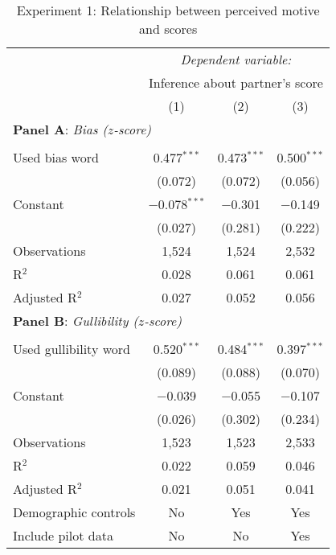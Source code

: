 \begin{table}[!htbp] \centering 
  \caption{Experiment 1: Relationship between perceived motive and scores}
  \label{t:1-validation}
\begin{threeparttable}
\begin{tabular}{@{\hspace{5pt}}l@{\hspace{5pt}}ccc} 
\toprule 
 & \multicolumn{3}{c}{\textit{Dependent variable:}} \\ 
\cmidrule(rr){2-4} 
 & \multicolumn{3}{c}{Inference about partner's score} \\ 
 \cmidrule(lr){2-4}
 & (1) & (2) & (3)\\ 
\midrule
\multicolumn{4}{l}{\textbf{Panel A}: \textit{Bias ($z$-score)}} \\
\midrule
\\[-2.1ex] Used bias word & 0.477$^{***}$ & 0.473$^{***}$ & 0.500$^{***}$ \\ 
  & (0.072) & (0.072) & (0.056) \\ 
 \addlinespace 
 Constant & $-$0.078$^{***}$ & $-$0.301 & $-$0.149 \\ 
  & (0.027) & (0.281) & (0.222) \\ 
 \addlinespace 
\midrule  
Observations & 1,524 & 1,524 & 2,532 \\ 
R$^{2}$ & 0.028 & 0.061 & 0.061 \\ 
Adjusted R$^{2}$ & 0.027 & 0.052 & 0.056 \\ 
\midrule
\multicolumn{4}{l}{\textbf{Panel B}: \textit{Gullibility ($z$-score)}} \\
\midrule
\\[-2.1ex] Used gullibility word & 0.520$^{***}$ & 0.484$^{***}$ & 0.397$^{***}$ \\ 
  & (0.089) & (0.088) & (0.070) \\ 
 \addlinespace 
 Constant & $-$0.039 & $-$0.055 & $-$0.107 \\ 
  & (0.026) & (0.302) & (0.234) \\ 
 \addlinespace 
\midrule  
Observations & 1,523 & 1,523 & 2,533 \\ 
R$^{2}$ & 0.022 & 0.059 & 0.046 \\ 
Adjusted R$^{2}$ & 0.021 & 0.051 & 0.041 \\ 
\midrule
Demographic controls & No & Yes & Yes \\ 
Include pilot data & No & No & Yes\\
\bottomrule 
\end{tabular} 
\begin{tablenotes}

\end{tablenotes}
\end{threeparttable}
\end{table}
